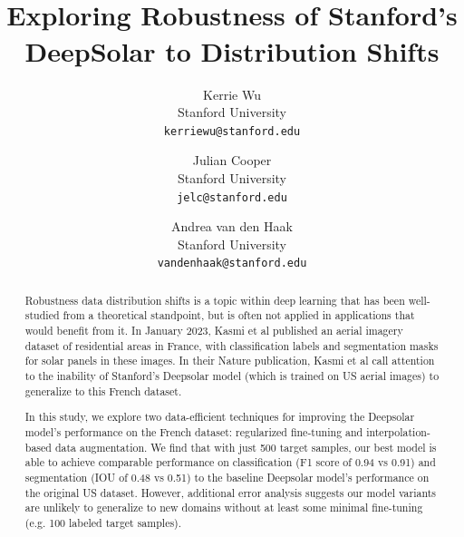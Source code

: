 \documentclass[10pt,twocolumn,letterpaper]{article}
\begin{document}
\title{\\Exploring Robustness of Stanford's DeepSolar to Distribution Shifts}


\author{Kerrie Wu \\
  Stanford University \\
  {\tt\small kerriewu@stanford.edu} \\
   \and
    Julian Cooper \\
  Stanford University \\
  \tt\small {jelc@stanford.edu} \\
   \and
   Andrea van den Haak \\
  Stanford University \\
  \tt\small {vandenhaak@stanford.edu} \\
}
\maketitle

\begin{abstract}
Robustness data distribution shifts is a topic within deep learning that has been well-studied from a theoretical standpoint, but is often not applied in applications that would benefit from it. In January 2023, Kasmi et al \cite{Kasmi2023} published an aerial imagery dataset of residential areas in France, with classification labels and segmentation masks for solar panels in these images. In their Nature publication, Kasmi et al call attention to the inability of Stanford's Deepsolar model (which is trained on US aerial images) to generalize to this French dataset.

In this study, we explore two data-efficient techniques for improving the Deepsolar model's performance on the French dataset: regularized fine-tuning and interpolation-based data augmentation. We find that with just 500 target samples, our best model is able to achieve comparable performance on classification (F1 score of 0.94 vs 0.91) and segmentation (IOU of 0.48 vs 0.51) to the baseline Deepsolar model's performance on the original US dataset. However, additional error analysis suggests our model variants are unlikely to generalize to new domains without at least some minimal fine-tuning (e.g. 100 labeled target samples).

\end{abstract}
\end{document}
